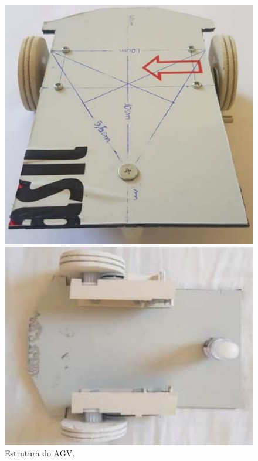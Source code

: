 \documentclass{textolivre-html}
\begin{document}
\begin{enumerate}
    \begin{figure}[h!]
    \begin{minipage}{0.47\textwidth}
    \includegraphics[width=\linewidth]{figure-08.pdf}
    \subcaption{}
    \end{minipage}
    \hfill
    \begin{minipage}{0.47\textwidth} 
    \includegraphics[width=\linewidth]{figure-09.pdf}
    \subcaption{}
    \end{minipage}
    \caption{Estrutura do AGV.}
    \label{fig04}
    \end{figure}
 
\end{enumerate}
\end{document}
